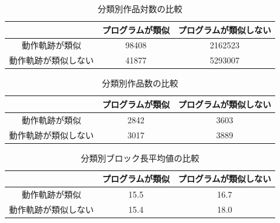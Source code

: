 \documentclass[T,J]{fose} %
\begin{document}
\begin{table}[ht]
    \centering
    \caption{分類別作品対数の比較}
    \begin{tabular}{|c|c|c|}
        \hline
        & プログラムが類似 & プログラムが類似しない \\
        \hline
        動作軌跡が類似 & \multicolumn{1}{c|}{98408} & \multicolumn{1}{c|}{2162523} \\
        \hline
        動作軌跡が類似しない & \multicolumn{1}{c|}{41877} & \multicolumn{1}{c|}{5293007} \\
        \hline
    \end{tabular}
    \captionsetup{skip=5pt}
    \label{table:programs-classification}
\end{table}

\begin{table}[ht]
    \centering
    \caption{分類別作品数の比較}
    \begin{tabular}{|c|c|c|}
        \hline
        & プログラムが類似 & プログラムが類似しない \\
        \hline
        動作軌跡が類似 & \multicolumn{1}{c|}{2842} & \multicolumn{1}{c|}{3603} \\
        \hline
        動作軌跡が類似しない & \multicolumn{1}{c|}{3017} & \multicolumn{1}{c|}{3889} \\
        \hline
    \end{tabular}
    \captionsetup{skip=5pt}
    \label{table:program-classification}
\end{table}

\begin{table}[ht]
    \centering
    \caption{分類別ブロック長平均値の比較}
    \begin{tabular}{|c|c|c|}
        \hline
        & プログラムが類似 & プログラムが類似しない \\
        \hline
        動作軌跡が類似 & \multicolumn{1}{c|}{15.5} & \multicolumn{1}{c|}{16.7} \\
        \hline
        動作軌跡が類似しない & \multicolumn{1}{c|}{15.4} & \multicolumn{1}{c|}{18.0} \\
        \hline
    \end{tabular}
    \captionsetup{skip=5pt}
    \label{table:program-length}
\end{table}
\end{document}
